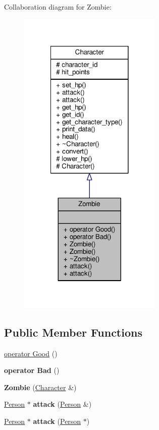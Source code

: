 Collaboration diagram for Zombie\-:
\nopagebreak
\begin{figure}[H]
\begin{center}
\leavevmode
\includegraphics[width=194pt]{class_zombie__coll__graph}
\end{center}
\end{figure}
\subsection*{Public Member Functions}
\begin{DoxyCompactItemize}
\item 
\hyperlink{class_zombie_a6f2a446e7ce66f88e5a7b67b9edf923a}{operator Good} ()
\item 
\hypertarget{class_zombie_ac5c3d335a7876a07b67a87735f643780}{{\bfseries operator Bad} ()}\label{class_zombie_ac5c3d335a7876a07b67a87735f643780}

\item 
\hypertarget{class_zombie_ac56331b5b7d745ddecc375d6f56342d0}{{\bfseries Zombie} (\hyperlink{class_character}{Character} \&)}\label{class_zombie_ac56331b5b7d745ddecc375d6f56342d0}

\item 
\hypertarget{class_zombie_ab0c8072e3ed7c699f3977efc7fd81261}{\hyperlink{class_person}{Person} $\ast$ {\bfseries attack} (\hyperlink{class_person}{Person} \&)}\label{class_zombie_ab0c8072e3ed7c699f3977efc7fd81261}

\item 
\hypertarget{class_zombie_ae6bb1769544b8501b0746a959347cf61}{\hyperlink{class_person}{Person} $\ast$ {\bfseries attack} (\hyperlink{class_person}{Person} $\ast$)}\label{class_zombie_ae6bb1769544b8501b0746a959347cf61}

\end{DoxyCompactItemize}
